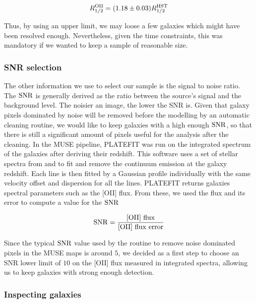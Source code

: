 \begin{equation}
	R_{1/2}^{\rm{OII}} = (1.18 \pm 0.03) R_{1/2}^{\rm{HST}}
\end{equation}

Thus, by using an upper limit, we may loose a few galaxies which might have been resolved enough. Nevertheless, given the time constraints, this was mandatory if we wanted to keep a sample of reasonable size.



\subsubsection{SNR selection}
\label{sec:cut_SNR}

The other information we use to select our sample is the signal to noise ratio. The $\rm{SNR}$ is generally derived as the ratio between the source's signal and the background level. The noisier an image, the lower the SNR is. Given that galaxy pixels dominated by noise will be removed before the modelling by an automatic cleaning routine, we would like to keep galaxies with a high enough $\rm{SNR}$, so that there is still a significant amount of pixels useful for the analysis after the cleaning. In the MUSE pipeline, \textsc{PLATEFIT}  was run on the integrated spectrum of the galaxies after deriving their redshift. This software uses a set of stellar spectra from  and  to fit and remove the continuum emission at the galaxy redshift. Each line is then fitted by a Gaussian profile individually with the same velocity offset and dispersion for all the lines. \textsc{PLATEFIT} returns galaxies spectral parameters such as the [OII] flux. From these, we used the flux and its error to compute a value for the $\rm{SNR}$

\begin{equation}
	\rm{SNR} = \frac{\rm{[OII] \,\, flux}}{\rm{[OII] \,\, flux \,\, error}}
\end{equation}

Since the typical $\rm{SNR}$ value used by the routine to remove noise dominated pixels in the MUSE maps is around $5$, we decided as a first step to choose an SNR lower limit of $10$ on the [OII] flux measured in integrated spectra, allowing us to keep galaxies with strong enough detection.


\newpage
\subsubsection{Inspecting galaxies}
\label{sec:selecting_galaxies}

